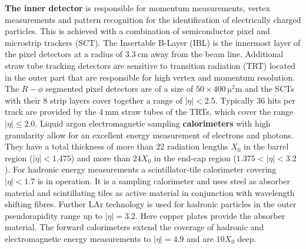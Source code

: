 \textbf{The inner detector} is responsible for momentum measurements, vertex measurements and pattern recognition for the identification of electrically charged particles. This is achieved with a combination of semiconductor pixel and microstrip trackers (SCT). The Insertable B-Layer (IBL) is the innermost layer of the pixel detectors at a radius of $\SI{3.3}{\centi\meter}$ away from the beam line. Additional straw tube tracking detectors are sensitive to transition radiation (TRT) located in the outer part that are responsible for high vertex and momentum resolution. The $R-\phi$ segmented pixel detectors are of a size of $50\times \SI{400}{\square\micro\meter}$ and the SCTs with their $8$ strip layers cover together a range of $|\eta|<2.5$. Typically $36$ hits per track are provided by the $\SI{4}{\milli\meter}$ straw tubes of the TRTs, which cover the range $|\eta|\leq 2.0$. \cite{IBL}\cite{ATLASJINST}\newline %
Liquid argon electromagnetic sampling \textbf{calorimeters} with high granularity allow for an excellent energy measurement of electrons and photons. They have a total thickness of more than $22$ radiation lengths $X_0$ in the barrel region ($|\eta|<1.475$) and more than $24X_0$ in the end-cap region ($1.375<|\eta|<3.2$). For hadronic energy measurements a scintillator-tile calorimeter covering $|\eta|<1.7$ is in operation. It is a sampling calorimeter and uses steel as absorber material and scintillating tiles as active material in conjunction with wavelength shifting fibres. Further LAr technology is used for hadronic particles in the outer pseudorapidity range up to $|\eta|=3.2$. Here copper plates provide the absorber material. The forward calorimeters extend the coverage of hadronic and electromagnetic energy measurements to $|\eta|=4.9$ and are $10X_0$ deep. \cite{ATLASJINST}\newline%
